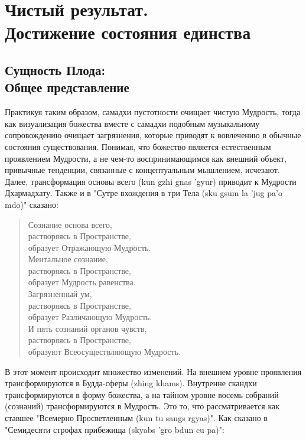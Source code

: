 \section{Чистый результат. \\ Достижение состояния единства}

\subsection{Сущность Плода: \\ Общее представление}

Практикуя таким образом, самадхи пустотности очищает чистую Мудрость, тогда как
визуализация божества вместе с самадхи подобным музыкальному сопровождению очищает
загрязнения, которые приводят к вовлечению в обычные состояния существования. Понимая,
что божество является естественным проявлением Мудрости, а не чем-то
воспринимающимся как внешний объект, привычные тенденции, связанные с
концептуальным мышлением, исчезают. Далее, трансформация основы всего (kun gzhi gnas
'gyur) приводит к Мудрости Дхармадхату. Также и в "Сутре вхождения в три Тела (sku gsum
la 'jug pa'o mdo)" сказано:

\begin{verse}
Сознание основа всего, \\
растворяясь в Пространстве, \\
образует Отражающую Мудрость. \\
Ментальное сознание, \\
растворяясь в Пространстве,\\
образует Мудрость равенства. \\
Загрязненный ум, \\
растворяясь в Пространстве, \\
образует Различающую Мудрость.\\
И пять сознаний органов чувств, \\
растворяясь в Пространстве, \\
образуют Всеосуществляющую Мудрость.
\end{verse}

В этот момент происходит множество изменений. На внешнем уровне проявления
трансформируются в Будда-сферы (zhing khams). Внутренне скандхи трансформируются в
форму божества, а на тайном уровне восемь собраний (сознаний) трансформируются в
Мудрость. Это то, что рассматривается как ставшее "Всемерно Просветленным (kun tu sangs
rgyas)". Как сказано в "Семидесяти строфах прибежища (skyabs 'gro bdun cu pa)":

